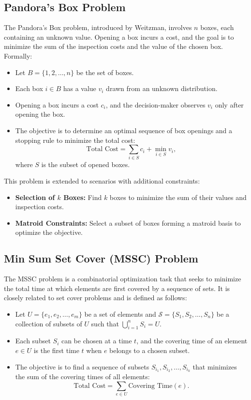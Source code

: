 \documentclass[11pt,a4paper]{article}
\begin{document}
\subsection{Pandora’s Box Problem}
The Pandora’s Box problem, introduced by Weitzman, involves \( n \) boxes, each containing an unknown value. Opening a box incurs a cost, and the goal is to minimize the sum of the inspection costs and the value of the chosen box. Formally:
\begin{itemize}
    \item Let \( B = \{1, 2, \dots, n\} \) be the set of boxes.
    \item Each box \( i \in B \) has a value \( v_i \) drawn from an unknown distribution.
    \item Opening a box incurs a cost \( c_i \), and the decision-maker observes \( v_i \) only after opening the box.
    \item The objective is to determine an optimal sequence of box openings and a stopping rule to minimize the total cost:
    \[
    \text{Total Cost} = \sum_{i \in S} c_i + \min_{i \in S} v_i,
    \]
    where \( S \) is the subset of opened boxes.
\end{itemize}

This problem is extended to scenarios with additional constraints:
\begin{itemize}
    \item \textbf{Selection of \( k \) Boxes:} Find \( k \) boxes to minimize the sum of their values and inspection costs.
    \item \textbf{Matroid Constraints:} Select a subset of boxes forming a matroid basis to optimize the objective.
\end{itemize}

\subsection{Min Sum Set Cover (MSSC) Problem}
The MSSC problem is a combinatorial optimization task that seeks to minimize the total time at which elements are first covered by a sequence of sets. It is closely related to set cover problems and is defined as follows:
\begin{itemize}
    \item Let \( U = \{e_1, e_2, \dots, e_m\} \) be a set of elements and \( \mathcal{S} = \{S_1, S_2, \dots, S_n\} \) be a collection of subsets of \( U \) such that \( \bigcup_{i=1}^n S_i = U \).
    \item Each subset \( S_i \) can be chosen at a time \( t \), and the covering time of an element \( e \in U \) is the first time \( t \) when \( e \) belongs to a chosen subset.
    \item The objective is to find a sequence of subsets \( S_{i_1}, S_{i_2}, \dots, S_{i_k} \) that minimizes the sum of the covering times of all elements:
    \[
    \text{Total Cost} = \sum_{e \in U} \text{Covering Time}(e).
    \]
\end{itemize}
\end{document}
